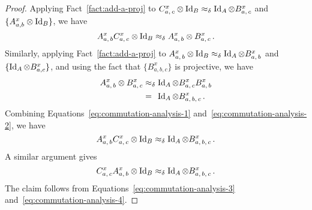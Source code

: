 \documentclass{book}
\theoremstyle{plain}
\theoremstyle{definition}
\theoremstyle{remark}
\numberwithin{equation}{subsection}
\newcommand{\Id}{\ensuremath{\mathop{\rm Id}\nolimits}}
\newcommand{\alice}{A}
\newcommand{\bob}{B}
\begin{document}
\begin{proof}
  Applying Fact~\ref{fact:add-a-proj} to $C^x_{a,\, c} \otimes \Id_\bob
  \approx_\delta \Id_\alice \otimes B^x_{a,\, c}$ and $\{A^x_{a,b} \otimes
  \Id_\bob \}$, we have
  \begin{equation}
    \label{eq:commutation-analysis-1}
    A^x_{a,\, b} C^x_{a,\, c} \otimes \Id_\bob
    \approx_\delta A^x_{a,\, b} \otimes B^x_{a,\, c}\,.
  \end{equation}
  Similarly, applying Fact~\ref{fact:add-a-proj} to $A^x_{a,\, b} \otimes
  \Id_\bob \approx_\delta \Id_\alice \otimes B^x_{a,\, b}$ and $\{\Id_\alice
  \otimes B^x_{a,c}\}$, and using the fact that $\{B^x_{a,b,c}\}$ is projective,
  we have
  \begin{equation}
    \label{eq:commutation-analysis-2}
    \begin{split}
      A^x_{a,\, b} \otimes B^x_{a,\, c}
      & \approx_\delta \Id_\alice \otimes B^x_{a,\, c} B^x_{a,\, b}\\
      & =_{\phantom{\delta}} \Id_\alice \otimes B^x_{a,\, b,\, c}\,.
    \end{split}
  \end{equation}
  Combining Equations~\eqref{eq:commutation-analysis-1}
  and~\eqref{eq:commutation-analysis-2}, we have
  \begin{equation}
    \label{eq:commutation-analysis-3}
    A^x_{a,\, b} C^x_{a,\, c} \otimes \Id_\bob \approx_\delta
    \Id_\alice \otimes B^x_{a,\, b,\, c}\,.
  \end{equation}
  A similar argument gives
  \begin{equation}
    \label{eq:commutation-analysis-4}
    C^x_{a,\, c} A^x_{a,\, b} \otimes \Id_\bob \approx_\delta
    \Id_\alice \otimes B^x_{a,\, b,\, c}\,.
  \end{equation}
  The claim follows from Equations~\eqref{eq:commutation-analysis-3}
  and~\eqref{eq:commutation-analysis-4}.
\end{proof}
\end{document}
